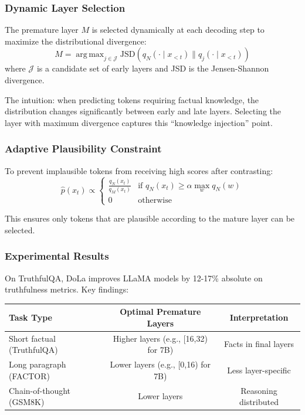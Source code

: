 \documentclass[11pt]{article}
\newcommand{\JSD}{\mathrm{JSD}}
\DeclareMathOperator*{\argmax}{arg\,max}
\begin{document}
\subsubsection{Dynamic Layer Selection}

The premature layer $M$ is selected dynamically at each decoding step to maximize the distributional divergence:
\begin{equation}
M = \argmax_{j \in \mathcal{J}} \JSD(q_N(\cdot \mid x_{<t}) \| q_j(\cdot \mid x_{<t}))
\end{equation}
where $\mathcal{J}$ is a candidate set of early layers and JSD is the Jensen-Shannon divergence.

The intuition: when predicting tokens requiring factual knowledge, the distribution changes significantly between early and late layers. Selecting the layer with maximum divergence captures this ``knowledge injection'' point.

\subsubsection{Adaptive Plausibility Constraint}

To prevent implausible tokens from receiving high scores after contrasting:
\begin{equation}
\hat{p}(x_t) \propto \begin{cases}
\frac{q_N(x_t)}{q_M(x_t)} & \text{if } q_N(x_t) \geq \alpha \max_w q_N(w) \\
0 & \text{otherwise}
\end{cases}
\end{equation}

This ensures only tokens that are plausible according to the mature layer can be selected.

\subsubsection{Experimental Results}

On TruthfulQA, DoLa improves LLaMA models by 12-17\% absolute on truthfulness metrics. Key findings:

\begin{center}
\begin{tabular}{lcc}
\hline
Task Type & Optimal Premature Layers & Interpretation \\
\hline
Short factual (TruthfulQA) & Higher layers (e.g., [16,32) for 7B) & Facts in final layers \\
Long paragraph (FACTOR) & Lower layers (e.g., [0,16) for 7B) & Less layer-specific \\
Chain-of-thought (GSM8K) & Lower layers & Reasoning distributed \\
\hline
\end{tabular}
\end{center}
\end{document}
